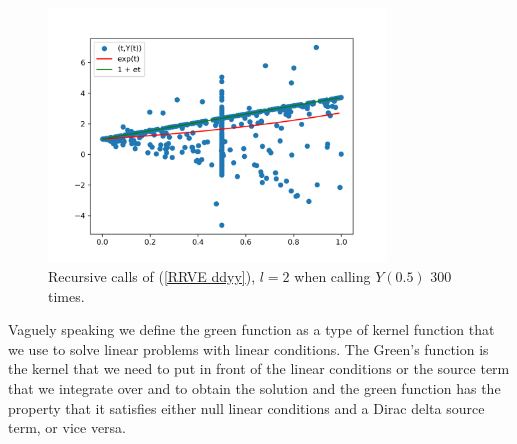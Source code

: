 \documentclass[a4paper,12pt]{article}
\begin{document}
\begin{example}[$y''=y$]
    \begin{figure}[h!]
        \centering
        \includegraphics[width=0.8\textwidth]{plots/ddyy.png}
        \caption{Recursive calls of (\ref{RRVE ddyy}), $l=2$ when
            calling $Y(0.5)$ $300$ times.}
        \label{fig:ddyy}
    \end{figure}

\end{example}


%
%
%

\begin{definition}
    Vaguely speaking we define the green function as a type of kernel function that we use
    to solve linear problems with linear conditions. The Green's function is the kernel that
    we need to put in front of  the linear conditions or the source term that we integrate
    over and to obtain the solution  and the green function has the property that it satisfies
    either null linear conditions and a Dirac delta source term, or vice versa.
\end{definition}
\end{document}
